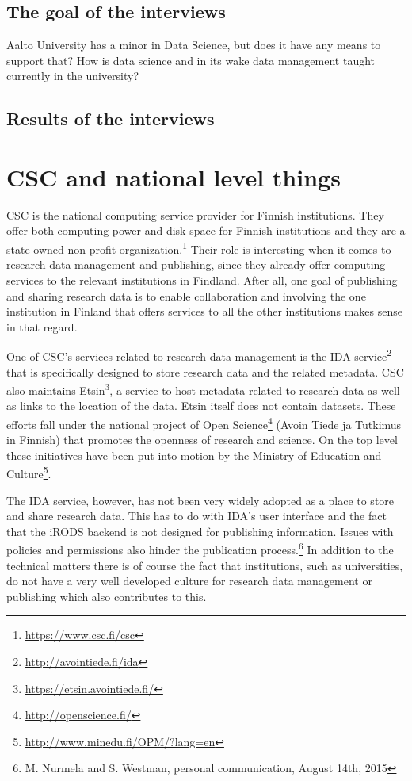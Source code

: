 \subsection{The goal of the interviews}

Aalto University has a minor in Data Science, but does it have any means to
support that? How is data science and in its wake data management taught
currently in the university?

\subsection{Results of the interviews}

\fi

\section{CSC and national level things}
\label{sec:csc}

CSC is the national computing service provider for Finnish institutions. They
offer both computing power and disk space for Finnish institutions and they
are a state-owned non-profit organization.\footnote{\url{https://www.csc.fi/csc}}
Their role is interesting when it comes to research data management and
publishing, since they already offer computing services to the relevant
institutions in Findland. After all, one goal of publishing and sharing
research data is to enable collaboration and involving the one institution
in Finland that offers services to all the other institutions makes sense in
that regard.

One of CSC's services related to research data management is the IDA
service\footnote{\url{http://avointiede.fi/ida}} that is specifically
designed to store research data and the related metadata. CSC also maintains
Etsin\footnote{\url{https://etsin.avointiede.fi/}}, a service to host
metadata related to research data as well as links to the location of the data.
Etsin itself does not contain datasets.
These efforts fall under the national project of Open
Science\footnote{\url{http://openscience.fi/}} (Avoin Tiede ja Tutkimus in
Finnish) that promotes the openness of research and science. On the top level
these initiatives have been put into motion by the Ministry of Education and
Culture\footnote{\url{http://www.minedu.fi/OPM/?lang=en}}.

The IDA service, however, has not been very widely adopted as a place to store
and share research data. This has to do with IDA's user interface and the fact
that the iRODS backend is not designed for publishing information. Issues with
policies and permissions also hinder the publication process.\footnote{M.
Nurmela and S. Westman, personal communication, August 14th, 2015} In addition
to the technical matters there is of course the fact that institutions, such as
universities, do not have a very well developed culture for research data
management or publishing which also contributes to this.

